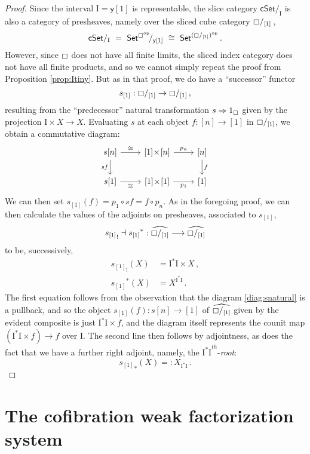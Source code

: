 \documentclass[11pt,reqno]{amsart}
\newcommand{\C}{\ensuremath{\boxempty}}
\newcommand{\psh}[1]{\ensuremath{\mathsf{Set}^{#1^{\mathrm{op}}}}}
\newcommand{\cSet}{\ensuremath{\mathsf{cSet}}}
\newcommand{\y}{\ensuremath{\mathsf{y}}} %
\renewcommand{\to}{\ensuremath{\rightarrow}}
\newcommand{\too}{\ensuremath{\longrightarrow}}
\newcommand{\I}{\ensuremath{\mathrm{I}}}
\theoremstyle{remark}
\theoremstyle{definition}
\begin{document}
\begin{proof}
Since the interval $\I = \y[1]$ is representable, the slice category $\cSet/_\I$ is also a category of presheaves, namely over the sliced cube category $\C/_{[1]}$\,,
\[
\cSet/_\I \ =\ {\psh{\C}}\!/_{\y[1]} \ \cong\ \psh{ (\C/_{[1]}) }\,.
\]
However, since $\C$ does not have all finite limits, the sliced index category does not have all finite products, and so we cannot simply repeat the proof from Proposition \ref{prop:Itiny}.  But as in that proof, we do have a ``successor'' functor 
\[
s_{[1]} : \C/_{[1]} \to \C/_{[1]}\,,
\]
resulting from the ``predecessor'' natural transformation $s \Rightarrow 1_\C$ given by the  projection $\I\times X \to X$. Evaluating $s$ at each object $f : [n] \to [1]$ in  $\C/_{[1]}$, we obtain a commutative diagram:
\begin{equation}\label{diag:snatural}
\begin{tikzcd}
s[n]  \ar[d,swap, "{sf}"] \ar[r, "{\cong}" ] & {[1]}\!\times\! {[n]}  \ar[r, "p_n"] & {[n]} \ar[d, "f"] \\  
s[1]  \ar[r, swap, "{\cong}" ] & {[1]}\!\times\! {[1]}  \ar[r, swap, "p_1"] & {[1]}
 \end{tikzcd}
 \end{equation}
We can then set $s_{[1]}(f) = p_1\circ sf = f\circ p_n$. As in the foregoing proof, we can then calculate the values of the adjoints on presheaves, associated to $s_{[1]}$,
 \[
 {s_{[1]}}_! \dashv {s_{[1]}}^* : \widehat{\C/_{[1]}} \too \widehat{\C/_{[1]}} \]
  to be, successively,
 \begin{align*}
 {s_{[1]}}_! (X) &= \I^*\I \times X\,, \\
  {s_{[1]}}^* (X) &= X^{\I^*\I} \,.
 \end{align*}
The first equation follows from the observation that the diagram \eqref{diag:snatural} is a pullback, and so the object $s_{[1]}(f)  : s[n]\to [1]$ of $\widehat{\C/_{[1]}}$ given by the evident composite is just $\I^*\I \times f $, and the diagram itself represents the counit map $(\I^*\I \times f) \to f$ over $\I$.
 The second line then follows by adjointness, as does the fact that we have a further right adjoint, namely, the ${\I^*\I}^{th}$-\emph{root}:
 \begin{equation*}
 {s_{[1]}}_* (X) =: X_{\I^*\I} \,.
 \end{equation*}
\end{proof}

\section{The cofibration weak factorization system}\label{sec:cofibrations}
\end{document}
